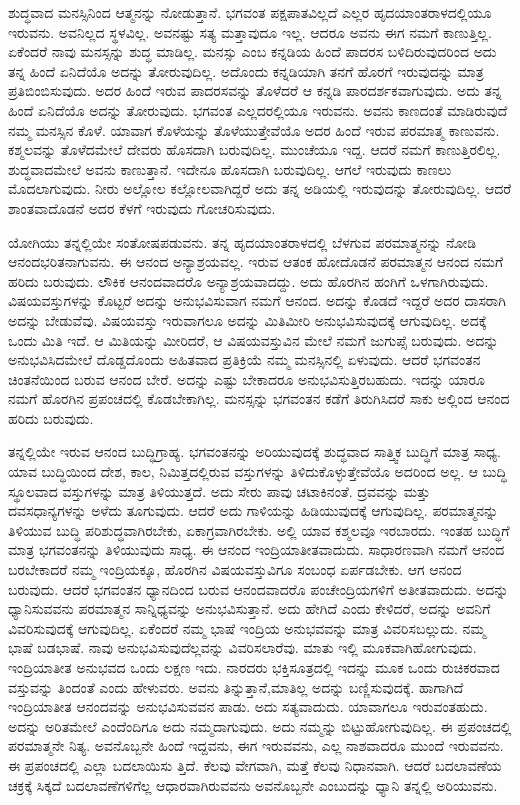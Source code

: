 ಶುದ್ಧವಾದ ಮನಸ್ಸಿನಿಂದ ಆತ್ಮನನ್ನು ನೋಡುತ್ತಾನೆ. ಭಗವಂತ ಪಕ್ಷಪಾತವಿಲ್ಲದೆ ಎಲ್ಲರ ಹೃದಯಾಂತರಾಳದಲ್ಲಿಯೂ ಇರುವನು. ಅವನಿಲ್ಲದ ಸ್ಥಳವಿಲ್ಲ. ಅವನಷ್ಟು ಸತ್ಯ ಮತ್ತಾವುದೂ ಇಲ್ಲ. ಆದರೂ ಅವನು ಈಗ ನಮಗೆ ಕಾಣುತ್ತಿಲ್ಲ. ಏಕೆಂದರೆ ನಾವು ಮನಸ್ಸನ್ನು ಶುದ್ಧ ಮಾಡಿಲ್ಲ. ಮನಸ್ಸು ಎಂಬ ಕನ್ನಡಿಯ ಹಿಂದೆ ಪಾದರಸ ಬಳಿದಿರುವುದರಿಂದ ಅದು ತನ್ನ ಹಿಂದೆ ಏನಿದೆಯೊ ಅದನ್ನು ತೋರುವುದಿಲ್ಲ. ಅದೊಂದು ಕನ್ನಡಿಯಾಗಿ ತನಗೆ ಹೊರಗೆ ಇರುವುದನ್ನು ಮಾತ್ರ ಪ್ರತಿಬಿಂಬಿಸುವುದು. ಅದರ ಹಿಂದೆ ಇರುವ ಪಾದರಸವನ್ನು ತೊಳೆದರೆ ಆ ಕನ್ನಡಿ ಪಾರದರ್ಶಕವಾಗುವುದು. ಅದು ತನ್ನ ಹಿಂದೆ ಏನಿದೆಯೊ ಅದನ್ನು ತೋರುವುದು. ಭಗವಂತ ಎಲ್ಲದರಲ್ಲಿಯೂ ಇರುವನು. ಅವನು ಕಾಣದಂತೆ ಮಾಡಿರುವುದೆ ನಮ್ಮ ಮನಸ್ಸಿನ ಕೊಳೆ. ಯಾವಾಗ ಕೊಳೆಯನ್ನು ತೊಳೆಯುತ್ತೇವೆಯೊ ಅದರ ಹಿಂದೆ ಇರುವ ಪರಮಾತ್ಮ ಕಾಣುವನು. ಕಶ್ಮಲವನ್ನು ತೊಳೆದಮೇಲೆ ದೇವರು ಹೊಸದಾಗಿ ಬರುವುದಿಲ್ಲ. ಮುಂಚೆಯೂ ಇದ್ದ. ಆದರೆ ನಮಗೆ ಕಾಣುತ್ತಿರಲಿಲ್ಲ. ಶುದ್ಧವಾದಮೇಲೆ ಅವನು ಕಾಣುತ್ತಾನೆ. ಇದೇನೂ ಹೊಸದಾಗಿ ಬರುವುದಿಲ್ಲ. ಆಗಲೆ ಇರುವುದು ಕಾಣಲು ಮೊದಲಾಗುವುದು. ನೀರು ಅಲ್ಲೋಲ ಕಲ್ಲೋಲವಾಗಿದ್ದರೆ ಅದು ತನ್ನ ಅಡಿಯಲ್ಲಿ ಇರುವುದನ್ನು ತೋರುವುದಿಲ್ಲ. ಆದರೆ ಶಾಂತವಾದೊಡನೆ ಅದರ ಕೆಳಗೆ ಇರುವುದು ಗೋಚರಿಸುವುದು.

ಯೋಗಿಯು ತನ್ನಲ್ಲಿಯೇ ಸಂತೋಷಪಡುವನು. ತನ್ನ ಹೃದಯಾಂತರಾಳದಲ್ಲಿ ಬೆಳಗುವ ಪರಮಾತ್ಮನನ್ನು ನೋಡಿ ಆನಂದಭರಿತನಾಗುವನು. ಈ ಆನಂದ ಅನ್ಯಾಶ್ರಯವಲ್ಲ. ಇರುವ ಆತಂಕ ಹೋದೊಡನೆ ಪರಮಾತ್ಮನ ಆನಂದ ನಮಗೆ ಹರಿದು ಬರುವುದು. ಲೌಕಿಕ ಆನಂದವಾದರೊ ಅನ್ಯಾಶ್ರಯವಾದದ್ದು. ಅದು ಹೊರಗಿನ ಹಂಗಿಗೆ ಒಳಗಾಗಿರುವುದು. ವಿಷಯವಸ್ತುಗಳನ್ನು ಕೊಟ್ಟರೆ ಅದನ್ನು ಅನುಭವಿಸುವಾಗ ನಮಗೆ ಆನಂದ. ಅದನ್ನು ಕೊಡದೆ ಇದ್ದರೆ ಅದರ ದಾಸರಾಗಿ ಅದನ್ನು ಬೇಡುವೆವು. ವಿಷಯವಸ್ತು ಇರುವಾಗಲೂ ಅದನ್ನು ಮಿತಿಮೀರಿ ಅನುಭವಿಸುವುದಕ್ಕೆ ಆಗುವುದಿಲ್ಲ. ಅದಕ್ಕೆ ಒಂದು ಮಿತಿ ಇದೆ. ಆ ಮಿತಿಯನ್ನು ಮೀರಿದರೆ, ಆ ವಿಷಯವಸ್ತುವಿನ ಮೇಲೆ ನಮಗೆ ಜುಗುಪ್ಸೆ ಬರುವುದು. ಅದನ್ನು ಅನುಭವಿಸಿದಮೇಲೆ ದೊಡ್ಡದೊಂದು ಅಹಿತವಾದ ಪ್ರತಿಕ್ರಿಯೆ ನಮ್ಮ ಮನಸ್ಸಿನಲ್ಲಿ ಏಳುವುದು. ಆದರೆ ಭಗವಂತನ ಚಿಂತನೆಯಿಂದ ಬರುವ ಆನಂದ ಬೇರೆ. ಅದನ್ನು ಎಷ್ಟು ಬೇಕಾದರೂ ಅನುಭವಿಸುತ್ತಿರಬಹುದು. ಇದನ್ನು ಯಾರೂ ನಮಗೆ ಹೊರಗಿನ ಪ್ರಪಂಚದಲ್ಲಿ ಕೊಡಬೇಕಾಗಿಲ್ಲ. ಮನಸ್ಸನ್ನು ಭಗವಂತನ ಕಡೆಗೆ ತಿರುಗಿಸಿದರೆ ಸಾಕು ಅಲ್ಲಿಂದ ಆನಂದ ಹರಿದು ಬರುವುದು.

ತನ್ನಲ್ಲಿಯೇ ಇರುವ ಆನಂದ ಬುದ್ಧಿಗ್ರಾಹ್ಯ. ಭಗವಂತನನ್ನು ಅರಿಯುವುದಕ್ಕೆ ಶುದ್ಧವಾದ ಸಾತ್ತ್ವಿಕ ಬುದ್ಧಿಗೆ ಮಾತ್ರ ಸಾಧ್ಯ. ಯಾವ ಬುದ್ಧಿಯಿಂದ ದೇಶ, ಕಾಲ, ನಿಮಿತ್ತದಲ್ಲಿರುವ ವಸ್ತುಗಳನ್ನು ತಿಳಿದುಕೊಳ್ಳುತ್ತೇವೆಯೊ ಅದರಿಂದ ಅಲ್ಲ. ಆ ಬುದ್ಧಿ ಸ್ಥೂಲವಾದ ವಸ್ತುಗಳನ್ನು ಮಾತ್ರ ತಿಳಿಯುತ್ತದೆ. ಅದು ಸೇರು ಪಾವು ಚಟಾಕಿನಂತೆ. ದ್ರವವನ್ನು ಮತ್ತು ದವಸಧಾನ್ಯಗಳನ್ನು ಅಳೆದು ತೂಗುವುದು. ಆದರೆ ಅದು ಗಾಳಿಯನ್ನು ಹಿಡಿಯುವುದಕ್ಕೆ ಆಗುವುದಿಲ್ಲ. ಪರಮಾತ್ಮನನ್ನು ತಿಳಿಯುವ ಬುದ್ಧಿ ಪರಿಶುದ್ಧವಾಗಿರಬೇಕು, ಏಕಾಗ್ರವಾಗಿರಬೇಕು. ಅಲ್ಲಿ ಯಾವ ಕಶ್ಮಲವೂ ಇರಬಾರದು. ಇಂತಹ ಬುದ್ಧಿಗೆ ಮಾತ್ರ ಭಗವಂತನನ್ನು ತಿಳಿಯುವುದು ಸಾಧ್ಯ. ಈ ಆನಂದ ಇಂದ್ರಿಯಾತೀತವಾದುದು. ಸಾಧಾರಣವಾಗಿ ನಮಗೆ ಆನಂದ ಬರಬೇಕಾದರೆ ನಮ್ಮ ಇಂದ್ರಿಯಕ್ಕೂ, ಹೊರಗಿನ ವಿಷಯವಸ್ತುವಿಗೂ ಸಂಬಂಧ ಏರ್ಪಡಬೇಕು. ಆಗ ಆನಂದ ಬರುವುದು. ಆದರೆ ಭಗವಂತನ ಧ್ಯಾನದಿಂದ ಬರುವ ಆನಂದವಾದರೊ ಪಂಚೇಂದ್ರಿಯಗಳಿಗೆ ಅತೀತವಾದುದು. ಅದನ್ನು ಧ್ಯಾನಿಸುವವನು ಪರಮಾತ್ಮನ ಸಾನ್ನಿಧ್ಯವನ್ನು ಅನುಭವಿಸುತ್ತಾನೆ. ಅದು ಹೇಗಿದೆ ಎಂದು ಕೇಳಿದರೆ, ಅದನ್ನು ಅವನಿಗೆ ವಿವರಿಸುವುದಕ್ಕೆ ಆಗುವುದಿಲ್ಲ. ಏಕೆಂದರೆ ನಮ್ಮ ಭಾಷೆ ಇಂದ್ರಿಯ ಅನುಭವವನ್ನು ಮಾತ್ರ ವಿವರಿಸಬಲ್ಲುದು. ನಮ್ಮ ಭಾಷೆ ಬಡಭಾಷೆ. ನಾವು ಅನುಭವಿಸುವುದೆಲ್ಲವನ್ನು ವಿವರಿಸಲಾರೆವು. ಮಾತು ಇಲ್ಲಿ ಮೂಕವಾಗಿಹೋಗುವುದು. ಇಂದ್ರಿಯಾತೀತ ಅನುಭವದ ಒಂದು ಲಕ್ಷಣ ಇದು. ನಾರದರು ಭಕ್ತಿಸೂತ್ರದಲ್ಲಿ ಇದನ್ನು ಮೂಕ ಒಂದು ರುಚಿಕರವಾದ ವಸ್ತುವನ್ನು ತಿಂದಂತೆ ಎಂದು ಹೇಳುವರು. ಅವನು ತಿನ್ನುತ್ತಾನೆ,\break ಮಾತಿಲ್ಲ ಅದನ್ನು ಬಣ್ಣಿಸುವುದಕ್ಕೆ. ಹಾಗಾಗಿದೆ ಇಂದ್ರಿಯಾತೀತ ಆನಂದವನ್ನು ಅನುಭವಿಸುವವನ ಪಾಡು. ಅದು ಸತ್ಯವಾದುದು. ಯಾವಾಗಲೂ ಇರುವಂತಹುದು. ಅದನ್ನು ಅರಿತಮೇಲೆ ಎಂದೆಂದಿಗೂ ಅದು ನಮ್ಮದಾಗುವುದು. ಅದು ನಮ್ಮನ್ನು ಬಿಟ್ಟುಹೋಗುವುದಿಲ್ಲ. ಈ ಪ್ರಪಂಚದಲ್ಲಿ ಪರಮಾತ್ಮನೇ ನಿತ್ಯ. ಅವನೊಬ್ಬನೇ ಹಿಂದೆ ಇದ್ದವನು, ಈಗ ಇರುವವನು, ಎಲ್ಲ ನಾಶವಾದರೂ ಮುಂದೆ ಇರುವವನು. ಈ ಪ್ರಪಂಚದಲ್ಲಿ ಎಲ್ಲಾ ಬದಲಾಯಿಸು ತ್ತಿದೆ. ಕೆಲವು ವೇಗವಾಗಿ, ಮತ್ತೆ ಕೆಲವು ನಿಧಾನವಾಗಿ. ಆದರೆ ಬದಲಾವಣೆಯ ಚಕ್ರಕ್ಕೆ ಸಿಕ್ಕದೆ ಬದಲಾವಣೆಗಳಿಗೆಲ್ಲ ಆಧಾರವಾಗಿರುವವನು ಅವನೊಬ್ಬನೇ ಎಂಬುದನ್ನು ಧ್ಯಾನಿ ತನ್ನಲ್ಲಿ ಅರಿಯುವನು.

